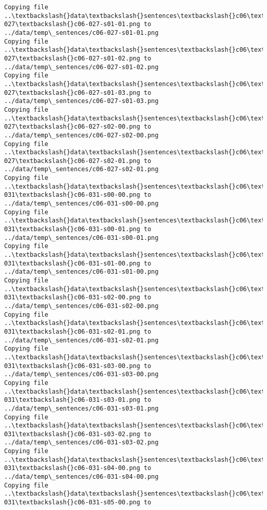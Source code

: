 \documentclass[11pt]{article}
\begin{document}
\begin{Verbatim}[commandchars=\\\{\}]
Copying file ..\textbackslash{}data\textbackslash{}sentences\textbackslash{}c06\textbackslash{}c06-027\textbackslash{}c06-027-s01-01.png to
../data/temp\_sentences/c06-027-s01-01.png
Copying file ..\textbackslash{}data\textbackslash{}sentences\textbackslash{}c06\textbackslash{}c06-027\textbackslash{}c06-027-s01-02.png to
../data/temp\_sentences/c06-027-s01-02.png
Copying file ..\textbackslash{}data\textbackslash{}sentences\textbackslash{}c06\textbackslash{}c06-027\textbackslash{}c06-027-s01-03.png to
../data/temp\_sentences/c06-027-s01-03.png
Copying file ..\textbackslash{}data\textbackslash{}sentences\textbackslash{}c06\textbackslash{}c06-027\textbackslash{}c06-027-s02-00.png to
../data/temp\_sentences/c06-027-s02-00.png
Copying file ..\textbackslash{}data\textbackslash{}sentences\textbackslash{}c06\textbackslash{}c06-027\textbackslash{}c06-027-s02-01.png to
../data/temp\_sentences/c06-027-s02-01.png
Copying file ..\textbackslash{}data\textbackslash{}sentences\textbackslash{}c06\textbackslash{}c06-031\textbackslash{}c06-031-s00-00.png to
../data/temp\_sentences/c06-031-s00-00.png
Copying file ..\textbackslash{}data\textbackslash{}sentences\textbackslash{}c06\textbackslash{}c06-031\textbackslash{}c06-031-s00-01.png to
../data/temp\_sentences/c06-031-s00-01.png
Copying file ..\textbackslash{}data\textbackslash{}sentences\textbackslash{}c06\textbackslash{}c06-031\textbackslash{}c06-031-s01-00.png to
../data/temp\_sentences/c06-031-s01-00.png
Copying file ..\textbackslash{}data\textbackslash{}sentences\textbackslash{}c06\textbackslash{}c06-031\textbackslash{}c06-031-s02-00.png to
../data/temp\_sentences/c06-031-s02-00.png
Copying file ..\textbackslash{}data\textbackslash{}sentences\textbackslash{}c06\textbackslash{}c06-031\textbackslash{}c06-031-s02-01.png to
../data/temp\_sentences/c06-031-s02-01.png
Copying file ..\textbackslash{}data\textbackslash{}sentences\textbackslash{}c06\textbackslash{}c06-031\textbackslash{}c06-031-s03-00.png to
../data/temp\_sentences/c06-031-s03-00.png
Copying file ..\textbackslash{}data\textbackslash{}sentences\textbackslash{}c06\textbackslash{}c06-031\textbackslash{}c06-031-s03-01.png to
../data/temp\_sentences/c06-031-s03-01.png
Copying file ..\textbackslash{}data\textbackslash{}sentences\textbackslash{}c06\textbackslash{}c06-031\textbackslash{}c06-031-s03-02.png to
../data/temp\_sentences/c06-031-s03-02.png
Copying file ..\textbackslash{}data\textbackslash{}sentences\textbackslash{}c06\textbackslash{}c06-031\textbackslash{}c06-031-s04-00.png to
../data/temp\_sentences/c06-031-s04-00.png
Copying file ..\textbackslash{}data\textbackslash{}sentences\textbackslash{}c06\textbackslash{}c06-031\textbackslash{}c06-031-s05-00.png to

\end{Verbatim}
\end{document}
